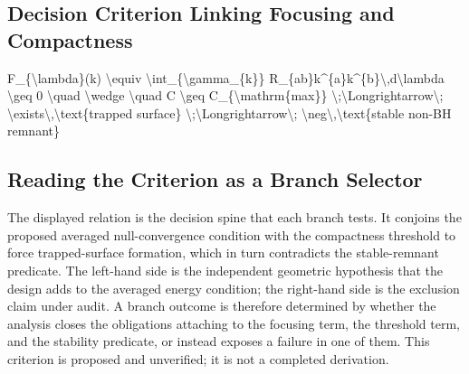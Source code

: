 \documentclass[conference]{IEEEtran}
\begin{document}
\subsection{Decision Criterion Linking Focusing and Compactness}
F\_\{\textbackslash{}lambda\}(k) \textbackslash{}equiv \textbackslash{}int\_\{\textbackslash{}gamma\_\{k\}\} R\_\{ab\}k\textasciicircum{}\{a\}k\textasciicircum{}\{b\}\textbackslash{},d\textbackslash{}lambda \textbackslash{}geq 0 \textbackslash{}quad \textbackslash{}wedge \textbackslash{}quad C \textbackslash{}geq C\_\{\textbackslash{}mathrm\{max\}\} \textbackslash{};\textbackslash{}Longrightarrow\textbackslash{}; \textbackslash{}exists\textbackslash{},\textbackslash{}text\{trapped surface\} \textbackslash{};\textbackslash{}Longrightarrow\textbackslash{}; \textbackslash{}neg\textbackslash{},\textbackslash{}text\{stable non-BH remnant\}

\subsection{Reading the Criterion as a Branch Selector}
The displayed relation is the decision spine that each branch tests. It conjoins the proposed averaged null-convergence condition with the compactness threshold to force trapped-surface formation, which in turn contradicts the stable-remnant predicate. The left-hand side is the independent geometric hypothesis that the design adds to the averaged energy condition; the right-hand side is the exclusion claim under audit. A branch outcome is therefore determined by whether the analysis closes the obligations attaching to the focusing term, the threshold term, and the stability predicate, or instead exposes a failure in one of them. This criterion is proposed and unverified; it is not a completed derivation.
\end{document}
